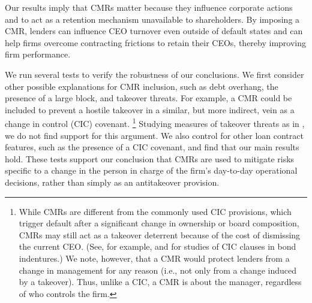 \documentclass[a4paper,12pt]{article}
\begin{document}
Our results imply that CMRs matter because they influence corporate actions and to act as a retention mechanism unavailable to shareholders.
By imposing a CMR, lenders can influence CEO turnover even outside of default states and can help firms overcome contracting frictions to retain their CEOs, thereby improving firm performance.



We run several tests to verify the robustness of our conclusions.
We first consider other possible explanations for CMR inclusion, such as debt overhang, the presence of a large block, and takeover threats.
For example, a CMR could be included to prevent a hostile takeover in a similar, but more indirect, vein as a change in control (CIC) covenant.%
    \footnote{While CMRs are different from the commonly used CIC provisions, which trigger default after a significant change in ownership or board composition, CMRs may still act as a takeover deterrent because of the cost of dismissing the current CEO.
    (See, for example, \citet{cook_1994} and \citet{Billett_2004} for studies of CIC clauses in bond indentures.)
    We note, however, that a CMR would protect lenders from a change in management for any reason (i.e., not only from a change induced by a takeover).
    Thus, unlike a CIC, a CMR is about the manager, regardless of who controls the firm.
    }
Studying measures of takeover threats as in \citet{Agrawal_1998}, we do not find support for this argument.
We also control for other loan contract features, such as the presence of a CIC covenant, and find that our main results hold.
These tests support our conclusion that CMRs are used to mitigate risks specific to a change in the person in charge of the firm's day-to-day operational decisions, rather than simply as an antitakeover provision.
\end{document}
